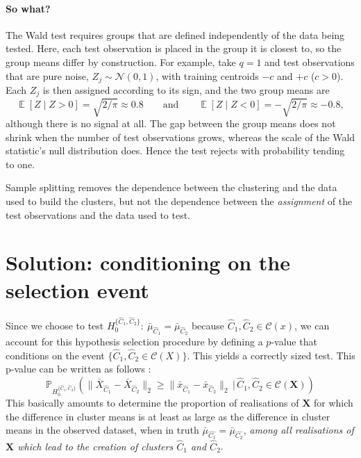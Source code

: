\documentclass[11pt,a4paper]{article}
\newcommand{\C}{\mathcal{C}}                       %
\newcommand{\norm}[1]{\lVert #1 \rVert_2}          %
\newcommand{\Hzero}{H_0^{\{\hat{C}_1,\hat{C}_2\}}} %
\DeclareMathOperator{\E}{\mathbb{E}}
\begin{document}
\paragraph{So what?}
The Wald test requires groups that are defined independently of the data being tested. Here, each test observation is placed in the group it is closest to, so the group means differ by construction. For example, take $q=1$ and test observations that are pure noise, $Z_j\sim\mathcal N(0,1)$, with training centroids $-c$ and $+c$ ($c>0$). Each $Z_j$ is then assigned according to its sign, and the two group means are
\[
  \E[Z\mid Z>0]=\sqrt{2/\pi}\approx 0.8
  \qquad\text{and}\qquad
  \E[Z\mid Z<0]=-\sqrt{2/\pi}\approx -0.8,
\]
although there is no signal at all. The gap between the group means does not shrink when the number of test observations grows, whereas the scale of the Wald statistic's null distribution does. Hence the test rejects with probability tending to one.

Sample splitting removes the dependence between the clustering and the data used to build the clusters, but not the dependence between the \emph{assignment} of the test observations and the data used to test.

\section{Solution: conditioning on the selection event}

Since we choose to test $\Hzero:\ \bar{\mu}_{\hat{C}_1}=\bar{\mu}_{\hat{C}_2}$ because $\hat{C}_1,\hat{C}_2\in\C(x)$, we can account for this hypothesis selection procedure by defining a $p$-value that conditions on the event $\{\hat{C}_1,\hat{C}_2\in\C(X)\}$. This yields a correctly sized test. This p-value can be written as follows :
\[
\mathbb{P}_{\Hzero}\left(\norm{\bar{X}_{\hat{C}_1} - \bar{X}_{\hat{C}_2}} \geq \norm{\bar{x}_{\hat{C}_1} - \bar{x}_{\hat{C}_2}} \,|\, \hat{C}_1, \hat{C}_2 \in \C(\mathbf{X})\right)
\]
This basically amounts to determine the proportion of realisations of $\mathbf{X}$ for which the difference in cluster means is at least as large as the difference in cluster means in the observed dataset, when in truth $\bar{\mu}_{\hat{C_1}} = \bar{\mu}_{\hat{C_2}}$, \textit{among all realisations of $\mathbf{X}$ which lead to the creation of clusters $\hat{C}_1$ and $\hat{C}_2$}.
\end{document}
